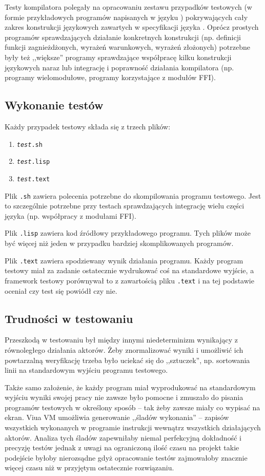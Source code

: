 Testy kompilatora polegały na opracowaniu zestawu przypadków testowych (w formie
przykładowych programów napisanych w języku \ViuAct) pokrywających cały zakres
konstrukcji językowych zawartych w specyfikacji języka \ViuAct. Oprócz prostych
programów sprawdzających działanie konkretnych konstrukcji (np. definicji
funkcji zagnieżdżonych, wyrażeń warunkowych, wyrażeń złożonych) potrzebne były
też ,,większe'' programy sprawdzające współpracę kilku konstrukcji językowych
naraz lub integrację i poprawność działania kompilatora (np. programy
wielomodułowe, programy korzystające z modułów FFI).

\subsection{Wykonanie testów}

Każdy przypadek testowy składa się z trzech plików:

\begin{enumerate}
    \item \texttt{\emph{test}.sh}
    \item \texttt{\emph{test}.lisp}
    \item \texttt{\emph{test}.text}
\end{enumerate}

Plik \texttt{.sh} zawiera polecenia potrzebne do skompilowania programu
testowego. Jest to szczególnie potrzebne przy testach sprawdzających
integrację wielu części języka (np. współpracy z modułami FFI).

Plik \texttt{.lisp} zawiera kod źródłowy przykładowego programu. Tych plików
może być więcej niż jeden w przypadku bardziej skomplikowanych programów.

Plik \texttt{.text} zawiera spodziewany wynik działania programu. Każdy program
testowy miał za zadanie ostatecznie wydrukować coś na standardowe wyjście, a
framework testowy porównywał to z zawartością pliku \texttt{.text} i na tej
podstawie oceniał czy test się powiódł czy nie.

\subsection{Trudności w testowaniu}

Przeszkodą w testowaniu był między innymi niedeterminizm wynikający z
równoległego działania aktorów. Żeby znormalizować wyniki i umożliwić ich
powtarzalną weryfikację trzeba było uciekać się do ,,sztuczek'', np. sortowania
linii na standardowym wyjściu programu testowego.

Także samo założenie, że każdy program miał wyprodukować na standardowym wyjściu
wyniki swojej pracy nie zawsze było pomocne i zmuszało do pisania programów
testowych w określony sposób -- tak żeby zawsze miały co wypisać na ekran.
Viua VM umożliwia generowanie ,,śladów wykonania'' -- zapisów wszystkich
wykonanych w programie instrukcji wewnątrz wszystkich działających aktorów.
Analiza tych śladów zapewniłaby niemal perfekcyjną dokładność i precyzję testów 
jednak z uwagi na ograniczoną ilość czasu na projekt takie podejście byłoby
nierozsądne gdyż opracowanie testów zajmowałoby znacznie więcej czasu niż w
przyjętym ostatecznie rozwiązaniu.


